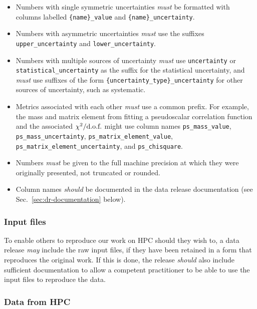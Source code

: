 \documentclass{article}
\newcommand\rfcword[1]{\emph{#1}\xspace}
\newcommand\must{\rfcword{must}}
\newcommand\should{\rfcword{should}}
\newcommand\may{\rfcword{may}}
\begin{document}
\begin{itemize}
  \item
        Numbers with single symmetric uncertainties \must be formatted with columns labelled
        \verb|{name}_value| and \verb|{name}_uncertainty|.
  \item
        Numbers with asymmetric uncertainties \must use the suffixes
        \verb|upper_uncertainty| and \verb|lower_uncertainty|.
  \item
        Numbers with multiple sources of uncertainty \must use
        \verb|uncertainty| or \verb|statistical_uncertainty|
        as the suffix for the statistical uncertainty,
        and \must use suffixes of the form
        \verb|{uncertainty_type}_uncertainty|
        for other sources of uncertainty,
        such as systematic.
  \item
        Metrics associated with each other \must use a common prefix.
        For example,
        the mass and matrix element from fitting a pseudoscalar correlation function
        and the associated $\chi^{2}/\textnormal{d.o.f.}$
        might use column names
        \verb|ps_mass_value|,
        \verb|ps_mass_uncertainty|,
        \verb|ps_matrix_element_value|,
        \verb|ps_matrix_element_uncertainty|,
        and \verb|ps_chisquare|.
  \item
        Numbers \must be given to the full machine precision at which they were originally presented,
        not truncated or rounded.
  \item
        Column names \should be documented in the data release documentation
        (see Sec.~\ref{sec:dr-documentation} below).
\end{itemize}

\subsubsection{Input files}

To enable others to reproduce our work on HPC should they wish to,
a data release \may include the raw input files,
if they have been retained in a form that reproduces the original work.
If this is done,
the release \should also include sufficient documentation
to allow a competent practitioner to be able to use the input files to reproduce the data.

\subsubsection{Data from HPC}\label{sec:dr-from-hpc}
\end{document}
